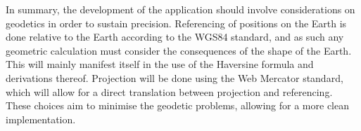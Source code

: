 In summary, the development of the application should involve considerations on geodetics in order to sustain precision. Referencing of positions on the Earth is done relative to the Earth according to the WGS84 standard, and as such any geometric calculation must consider the consequences of the shape of the Earth. This will mainly manifest itself in the use of the Haversine formula and derivations thereof. Projection will be done using the Web Mercator standard, which will allow for a direct translation between projection and referencing. These choices aim to minimise the geodetic problems, allowing for a more clean implementation.





































































